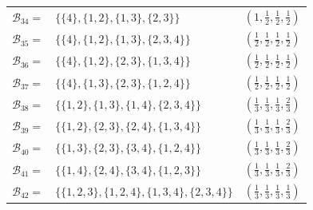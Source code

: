 \documentclass[10pt,a4paper,titlepage]{article}
\theoremstyle{plain}
\theoremstyle{definition}
\begin{document}
\begin{tabular}{ | r l | c | }
    $\mathcal{B}_{34} =$ & $\{\{4\}, \{1,2\}, \{1,3\}, \{2,3\}\}$ & $\left(1, \frac{1}{2}, \frac{1}{2}, \frac{1}{2}\right)$\\[2pt]
    $\mathcal{B}_{35} =$ & $\{\{4\}, \{1,2\}, \{1,3\}, \{2,3,4\}\}$ & $\left(\frac{1}{2}, \frac{1}{2}, \frac{1}{2}, \frac{1}{2}\right)$\\[2pt]
    $\mathcal{B}_{36} =$ & $\{\{4\}, \{1,2\}, \{2,3\}, \{1,3,4\}\}$ & $\left(\frac{1}{2}, \frac{1}{2}, \frac{1}{2}, \frac{1}{2}\right)$\\[2pt]
    $\mathcal{B}_{37} =$ & $\{\{4\}, \{1,3\}, \{2,3\}, \{1,2,4\}\}$ & $\left(\frac{1}{2}, \frac{1}{2}, \frac{1}{2}, \frac{1}{2}\right)$\\[2pt]
    $\mathcal{B}_{38} =$ & $\{\{1,2\}, \{1,3\}, \{1,4\}, \{2,3,4\}\}$ & $\left(\frac{1}{3}, \frac{1}{3}, \frac{1}{3}, \frac{2}{3}\right)$\\[2pt]
    $\mathcal{B}_{39} =$ & $\{\{1,2\}, \{2,3\}, \{2,4\}, \{1,3,4\}\}$ & $\left(\frac{1}{3}, \frac{1}{3}, \frac{1}{3}, \frac{2}{3}\right)$\\[2pt]
    $\mathcal{B}_{40} =$ & $\{\{1,3\}, \{2,3\}, \{3,4\}, \{1,2,4\}\}$ & $\left(\frac{1}{3}, \frac{1}{3}, \frac{1}{3}, \frac{2}{3}\right)$\\[2pt]
    $\mathcal{B}_{41} =$ & $\{\{1,4\}, \{2,4\}, \{3,4\}, \{1,2,3\}\}$ & $\left(\frac{1}{3}, \frac{1}{3}, \frac{1}{3}, \frac{2}{3}\right)$\\[2pt]
    $\mathcal{B}_{42} =$ & $\{\{1,2,3\}, \{1,2,4\}, \{1,3,4\}, \{2,3,4\}\}$ & $\left(\frac{1}{3}, \frac{1}{3}, \frac{1}{3}, \frac{1}{3}\right)$\\[2pt]
    \hline
\end{tabular}
 
\printbibliography
\end{document}
